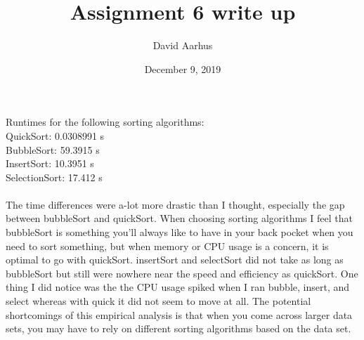 \documentclass[12pt, technote]{IEEEtran}
\title{Assignment 6 write up}
\author{David Aarhus}
\date{December 9, 2019}
\begin{document}
\maketitle

\indent Runtimes for the following sorting algorithms:\\
\indent \indent QuickSort: 0.0308991 s\\
\indent \indent BubbleSort: 59.3915 s\\
\indent \indent InsertSort: 10.3951 s\\
\indent \indent SelectionSort: 17.412 s\\
\\
\indent The time differences were a-lot more drastic than I thought, especially the gap between bubbleSort and quickSort. When choosing sorting algorithms I feel that bubbleSort is something you'll always like to have in your back pocket when you need to sort something, but when memory or CPU usage is a concern, it is optimal to go with quickSort. insertSort and selectSort did not take as long as bubbleSort but still were nowhere near the speed and efficiency as quickSort. One thing I did notice was the the CPU usage spiked when I ran bubble, insert, and select whereas with quick it did not seem to move at all. The potential shortcomings of this empirical analysis is that when you come across larger data sets, you may have to rely on different sorting algorithms based on the data set.  
\end{document}
